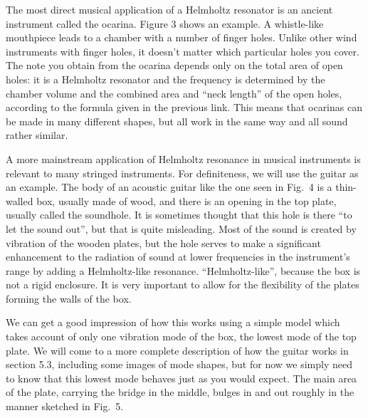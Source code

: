   The most direct musical application of a Helmholtz resonator is an ancient 
  instrument called the ocarina. Figure 3 shows an example. A whistle-like 
  mouthpiece leads to a chamber with a number of finger holes. Unlike other 
  wind instruments with finger holes, it doesn't matter which particular holes 
  you cover. The note you obtain from the ocarina depends only on the total 
  area of open holes: it is a Helmholtz resonator and the frequency is 
  determined by the chamber volume and the combined area and ``neck length'' of 
  the open holes, according to the formula given in the previous link. This 
  means that ocarinas can be made in many different shapes, but all work in the 
  same way and all sound rather similar. 

  A more mainstream application of Helmholtz resonance in musical instruments 
  is relevant to many stringed instruments. For definiteness, we will use the 
  guitar as an example. The body of an acoustic guitar like the one seen in 
  Fig.\ 4 is a thin-walled box, usually made of wood, and there is an opening 
  in the top plate, usually called the soundhole. It is sometimes thought that 
  this hole is there ``to let the sound out'', but that is quite misleading. 
  Most of the sound is created by vibration of the wooden plates, but the hole 
  serves to make a significant enhancement to the radiation of sound at lower 
  frequencies in the instrument's range by adding a Helmholtz-like resonance. 
  ``Helmholtz-like'', because the box is not a rigid enclosure. It is very 
  important to allow for the flexibility of the plates forming the walls of the 
  box. 


  We can get a good impression of how this works using a simple model which 
  takes account of only one vibration mode of the box, the lowest mode of the 
  top plate. We will come to a more complete description of how the guitar 
  works in section 5.3, including some images of mode shapes, but for now we 
  simply need to know that this lowest mode behaves just as you would expect. 
  The main area of the plate, carrying the bridge in the middle, bulges in and 
  out roughly in the manner sketched in Fig.\ 5. 


